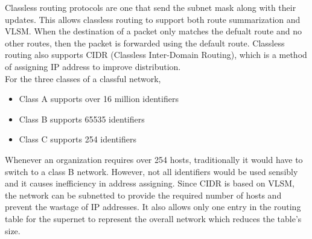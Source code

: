 \documentclass{lab_sheet}
\begin{document}
     Classless routing protocols are one that send the subnet mask along with their updates. This allows classless routing to support both route summarization and VLSM. When the destination of a packet only matches the defualt route and no other routes, then the packet is forwarded using the default route. Classless routing also supports CIDR (Classless Inter-Domain Routing), which is a method of assigning IP address to improve distribution. \\[\baselineskip]
     For the three classes of a classful network,
     \begin{itemize}
         \item Class A supports over 16 million identifiers
         \item Class B supports 65535 identifiers
         \item Class C supports 254 identifiers
     \end{itemize}
     Whenever an organization requires over 254 hosts, traditionally it would have to switch to a class B network. However, not all identifiers would be used sensibly and it causes inefficiency in address assigning. Since CIDR is based on VLSM, the network can be subnetted to provide the required number of hosts and prevent the wastage of IP addresses. It also allows only one entry in the routing table for the supernet to represent the overall network which reduces the table's size.
\end{document}
